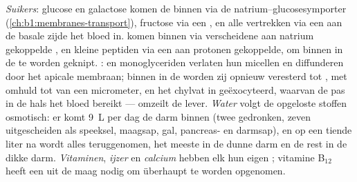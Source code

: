\begin{proposition}\label{prop:b1:digestion-absorption:routes}
\emph{Suikers}: glucose en galactose komen de  binnen via de
natrium--glucosesymporter (\cref{ch:b1:membranes-transport}), fructose via
een , en alle vertrekken via een  aan de basale zijde het
bloed in. \emph{} komen binnen via verscheidene aan natrium
gekoppelde , en kleine peptiden via een aan protonen gekoppelde,
om binnen in de  te worden geknipt. \emph{}:  en
monoglyceriden verlaten hun micellen en diffunderen door het apicale
membraan; binnen in de  worden zij opnieuw veresterd tot ,
met  omhuld tot \emph{} van een micrometer, en het
chylvat in geëxocyteerd, waarvan de  pas in de hals het bloed bereikt
---  omzeilt de lever. \emph{Water} volgt de opgeloste stoffen
osmotisch: er komt \qty{9}{L} per dag de darm binnen (twee gedronken,
zeven uitgescheiden als speeksel, maagsap, gal, pancreas- en darmsap), en
op een tiende liter na wordt alles teruggenomen, het meeste in de dunne
darm en de rest in de dikke darm. \emph{Vitaminen}, \emph{ijzer} en
\emph{calcium} hebben elk hun eigen ; vitamine B$_{12}$ heeft een
 uit de maag nodig om überhaupt te worden opgenomen.
\end{proposition}

